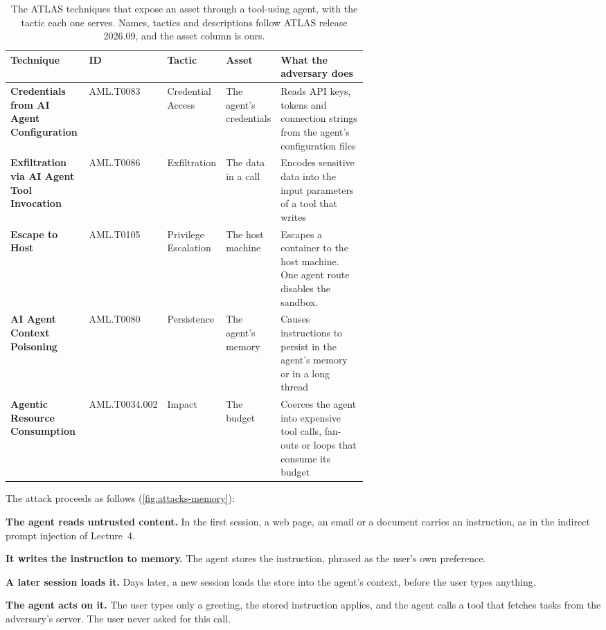 \begin{table}[tb]
  \caption{The ATLAS techniques that expose an asset through a tool-using agent, with the tactic
  each one serves. Names, tactics and descriptions follow ATLAS release 2026.09, and the asset
  column is ours.}
  \label{tab:attacks-summary}
  \begin{adjustbox}{width=\linewidth}\begin{tabularx}{\linewidth}{L{0.22\linewidth}L{0.125\linewidth}L{0.13\linewidth}L{0.12\linewidth}X}
    \toprule
    \textbf{Technique} & \textbf{ID} & \textbf{Tactic} & \textbf{Asset} & \textbf{What the adversary does} \\
    \midrule
    \textbf{Credentials from AI Agent Configuration} & AML.T0083 & Credential Access & The agent's
    credentials & Reads API keys, tokens and connection strings from the agent's configuration files \\
    \textbf{Exfiltration via AI Agent Tool Invocation} & AML.T0086 & Exfiltration & The data in a
    call & Encodes sensitive data into the input parameters of a tool that writes \\
    \textbf{Escape to Host} & AML.T0105 & Privilege Escalation & The host machine & Escapes a
    container to the host machine. One agent route disables the sandbox. \\
    \textbf{AI Agent Context Poisoning} & AML.T0080 & Persistence & The agent's memory & Causes
    instructions to persist in the agent's memory or in a long thread \\
    \textbf{Agentic Resource Consumption} & AML.T0034.002 & Impact & The budget & Coerces the agent
    into expensive tool calls, fan-outs or loops that consume its budget \\
    \bottomrule
  \end{tabularx}\end{adjustbox}
\end{table}

The attack proceeds as follows (\cref{fig:attacks-memory}):
\be
\item \textbf{The agent reads untrusted content.} In the first session, a web page, an email or a
document carries an instruction, as in the indirect prompt injection of Lecture~4.
\item \textbf{It writes the instruction to memory.} The agent stores the instruction, phrased as the
user's own preference.
\item \textbf{A later session loads it.} Days later, a new session loads the store into the agent's
context, before the user types anything.
\item \textbf{The agent acts on it.} The user types only a greeting, the stored instruction applies,
and the agent calls a tool that fetches tasks from the adversary's server. The user never asked for
this call.
\ee


